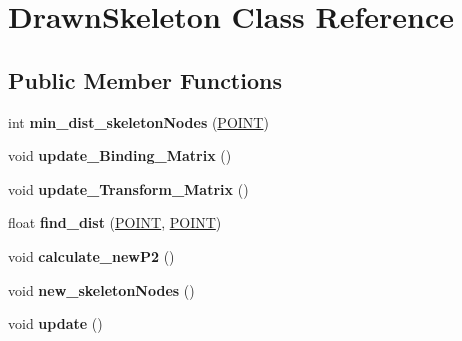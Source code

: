 \hypertarget{classDrawnSkeleton}{\section{\-Drawn\-Skeleton \-Class \-Reference}
\label{classDrawnSkeleton}
}
\subsection*{\-Public \-Member \-Functions}
\begin{DoxyCompactItemize}
\item 
\hypertarget{classDrawnSkeleton_aa5778650debd810ce52d65cac4a46482}{int {\bfseries min\-\_\-dist\-\_\-skeleton\-Nodes} (\hyperlink{structPOINT}{\-P\-O\-I\-N\-T})}\label{classDrawnSkeleton_aa5778650debd810ce52d65cac4a46482}

\item 
\hypertarget{classDrawnSkeleton_a4b0de2a84fda7555e40f2b1cdef5ee83}{void {\bfseries update\-\_\-\-Binding\-\_\-\-Matrix} ()}\label{classDrawnSkeleton_a4b0de2a84fda7555e40f2b1cdef5ee83}

\item 
\hypertarget{classDrawnSkeleton_aa8d84a14ae641abe8e6d59ec0aefb5dd}{void {\bfseries update\-\_\-\-Transform\-\_\-\-Matrix} ()}\label{classDrawnSkeleton_aa8d84a14ae641abe8e6d59ec0aefb5dd}

\item 
\hypertarget{classDrawnSkeleton_a121370d515d5cc1d217f5ef2db53513e}{float {\bfseries find\-\_\-dist} (\hyperlink{structPOINT}{\-P\-O\-I\-N\-T}, \hyperlink{structPOINT}{\-P\-O\-I\-N\-T})}\label{classDrawnSkeleton_a121370d515d5cc1d217f5ef2db53513e}

\item 
\hypertarget{classDrawnSkeleton_ab10e74a5a78dca908e9ee05548ba0036}{void {\bfseries calculate\-\_\-new\-P2} ()}\label{classDrawnSkeleton_ab10e74a5a78dca908e9ee05548ba0036}

\item 
\hypertarget{classDrawnSkeleton_ac9121b8c20c0059da6a99ed8a58a0ed4}{void {\bfseries new\-\_\-skeleton\-Nodes} ()}\label{classDrawnSkeleton_ac9121b8c20c0059da6a99ed8a58a0ed4}

\item 
\hypertarget{classDrawnSkeleton_ad38f1661673431a72236c882c01e1011}{void {\bfseries update} ()}\label{classDrawnSkeleton_ad38f1661673431a72236c882c01e1011}

\end{DoxyCompactItemize}
